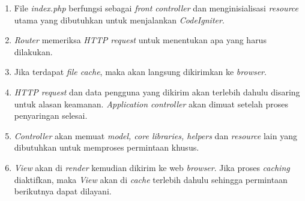 \begin{enumerate}
	\item File \textit{index.php} berfungsi sebagai \textit{front controller} dan menginisialisasi \textit{resource} utama yang dibutuhkan untuk menjalankan \textit{CodeIgniter}.
	\item \textit{Router} memeriksa \textit{HTTP request} untuk menentukan apa yang harus dilakukan.
	\item Jika terdapat \textit{file cache}, maka akan langsung dikirimkan ke \textit{browser}.
	\item \textit{HTTP request} dan data pengguna yang dikirim akan terlebih dahulu disaring untuk alasan keamanan. \textit{Application controller} akan dimuat setelah proses penyaringan selesai.
	\item \textit{Controller} akan memuat \textit{model, core libraries, helpers} dan \textit{resource} lain yang dibutuhkan untuk memproses permintaan khusus.
	\item \textit{View} akan di \textit{render} kemudian dikirim ke web \textit{browser}. Jika proses \textit{caching} diaktifkan, maka \textit{View} akan di \textit{cache} terlebih dahulu sehingga permintaan berikutnya dapat dilayani.
\end{enumerate}


